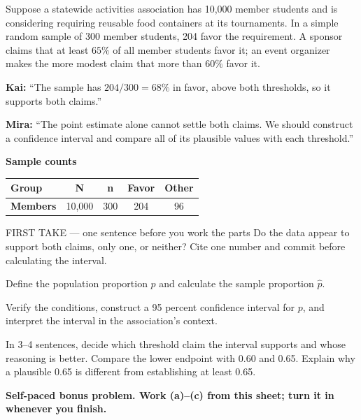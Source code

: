 \documentclass[14pt]{extarticle}
\begin{document}
\pagestyle{empty}


\noindent\begin{minipage}[t]{0.57\linewidth}
\vspace{0pt}
Suppose a statewide activities association has 10,000 member students and is considering requiring reusable food containers at its tournaments. In a simple random sample of 300 member students, 204 favor the requirement. A sponsor claims that at least $65\%$ of all member students favor it; an event organizer makes the more modest claim that more than $60\%$ favor it.\par\smallskip \textbf{Kai:} ``The sample has $204/300=68\%$ in favor, above both thresholds, so it supports both claims.''\par \textbf{Mira:} ``The point estimate alone cannot settle both claims. We should construct a confidence interval and compare all of its plausible values with each threshold.''\par
\end{minipage}\hfill
\begin{minipage}[t]{0.40\linewidth}
\vspace{0pt}
\begin{center}
\textbf{Sample counts}\par\smallskip
\begin{tabular}{|l|c|c|c|c|}
\hline
\textbf{Group} & \textbf{N} & \textbf{n} & \textbf{Favor} & \textbf{Other} \\ \hline
\textbf{Members} & 10,000 & 300 & 204 & 96 \\ \hline
\end{tabular}
\end{center}
\end{minipage}

\begin{firsttakebox}{FIRST TAKE --- one sentence before you work the parts}
Do the data appear to support both claims, only one, or neither? Cite one number and commit before calculating the interval.
\end{firsttakebox}

\begin{description}[leftmargin=1.15in, labelwidth=1in, itemsep=2pt, topsep=2pt]
  \item[\dokbadge{1}~(a)] Define the population proportion $p$ and calculate the sample proportion $\hat p$.
  \item[\dokbadge{2}~(b)] Verify the conditions, construct a 95 percent confidence interval for $p$, and interpret the interval in the association's context.
  \item[\dokbadge{3}~(c)] In 3--4 sentences, decide which threshold claim the interval supports and whose reasoning is better. Compare the lower endpoint with 0.60 and 0.65. Explain why a plausible 0.65 is different from establishing at least 0.65.
\end{description}

\vfill
\textbf{Self-paced bonus problem. Work (a)--(c) from this sheet; turn it in whenever you finish.}
\end{document}
